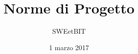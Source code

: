 



\title{\textbf{Norme di Progetto}}
\author{SWEetBIT}

\date{1 marzo 2017}




\makeFrontPage

\tableofcontents





